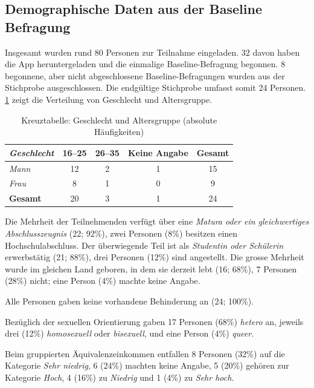 \subsection*{Demographische Daten aus der Baseline Befragung}

Insgesamt wurden rund 80 Personen zur Teilnahme eingeladen. 32 davon haben die App heruntergeladen und die einmalige Baseline-Befragung begonnen. 8 begonnene, aber nicht abgeschlossene Baseline-Befragungen wurden aus der Stichprobe ausgeschlossen. Die endgültige Stichprobe umfasst somit 24 Personen. \cref{tab:kreuztabelle_abs} zeigt die Verteilung von Geschlecht und Altersgruppe.




\begin{table}[htb]
    \footnotesize
    \caption{Kreuztabelle: Geschlecht und Altersgruppe (absolute Häufigkeiten)}
    \label{tab:kreuztabelle_abs}
    \centering
    \begin{tabular}{lcccc}
        \toprule
        \emph{Geschlecht} & 16--25 & 26--35 & Keine Angabe & \multicolumn{1}{c}{Gesamt} \\
        \midrule
        \emph{Mann} & 12 & 2 & 1 & 15 \\
        \emph{Frau} &  8 & 1 & 0 &  9 \\
        \midrule
        \textbf{Gesamt} & 20 & 3 & 1 & 24 \\
    \end{tabular}
    \normalsize
\end{table}
    
  

Die Mehrheit der Teilnehmenden verfügt über eine \emph{Matura oder ein gleichwertiges Abschlusszeugnis} (22; 92\%), zwei Personen (8\%) besitzen einen Hochschulabschluss. Der überwiegende Teil ist als \emph{Student\genderstern in oder Schüler\genderstern in} erwerbstätig (21; 88\%), drei Personen (12\%) sind angestellt. Die grosse Mehrheit wurde im gleichen Land geboren, in dem sie derzeit lebt (16; 68\%), 7 Personen (28\%) nicht; eine Person (4\%) machte keine Angabe.

Alle Personen gaben keine vorhandene Behinderung an (24; 100\%).

Bezüglich der sexuellen Orientierung gaben 17 Personen (68\%) \emph{hetero} an, jeweils drei (12\%) \emph{homosexuell} oder \emph{bisexuell}, und eine Person (4\%) \emph{queer}.

Beim gruppierten Äquivalenzeinkommen entfallen 8 Personen (32\%) auf die Kategorie \emph{Sehr niedrig}, 6 (24\%) machten keine Angabe, 5 (20\%) gehören zur Kategorie \emph{Hoch}, 4 (16\%) zu \emph{Niedrig} und 1 (4\%) zu \emph{Sehr hoch}.

